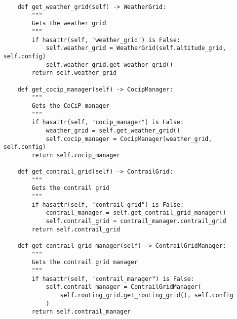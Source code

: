 \begin{verbatim}
    def get_weather_grid(self) -> WeatherGrid:
        """
        Gets the weather grid
        """
        if hasattr(self, "weather_grid") is False:
            self.weather_grid = WeatherGrid(self.altitude_grid, self.config)
            self.weather_grid.get_weather_grid()
        return self.weather_grid

    def get_cocip_manager(self) -> CocipManager:
        """
        Gets the CoCiP manager
        """
        if hasattr(self, "cocip_manager") is False:
            weather_grid = self.get_weather_grid()
            self.cocip_manager = CocipManager(weather_grid, self.config)
        return self.cocip_manager

    def get_contrail_grid(self) -> ContrailGrid:
        """
        Gets the contrail grid
        """
        if hasattr(self, "contrail_grid") is False:
            contrail_manager = self.get_contrail_grid_manager()
            self.contrail_grid = contrail_manager.contrail_grid
        return self.contrail_grid

    def get_contrail_grid_manager(self) -> ContrailGridManager:
        """
        Gets the contrail grid manager
        """
        if hasattr(self, "contrail_manager") is False:
            self.contrail_manager = ContrailGridManager(
                self.routing_grid.get_routing_grid(), self.config
            )
        return self.contrail_manager

\end{verbatim}
